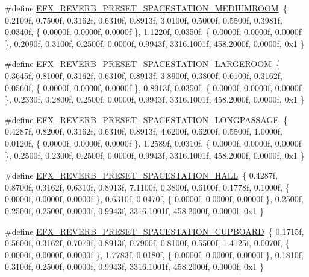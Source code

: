 \begin{DoxyCompactItemize}
\item 
\#define \mbox{\hyperlink{efx-presets_8h_a2ca95e780372e4102f6439c01bbb4c47}{E\+F\+X\+\_\+\+R\+E\+V\+E\+R\+B\+\_\+\+P\+R\+E\+S\+E\+T\+\_\+\+S\+P\+A\+C\+E\+S\+T\+A\+T\+I\+O\+N\+\_\+\+M\+E\+D\+I\+U\+M\+R\+O\+OM}}~\{ 0.\+2109f, 0.\+7500f, 0.\+3162f, 0.\+6310f, 0.\+8913f, 3.\+0100f, 0.\+5000f, 0.\+5500f, 0.\+3981f, 0.\+0340f, \{ 0.\+0000f, 0.\+0000f, 0.\+0000f \}, 1.\+1220f, 0.\+0350f, \{ 0.\+0000f, 0.\+0000f, 0.\+0000f \}, 0.\+2090f, 0.\+3100f, 0.\+2500f, 0.\+0000f, 0.\+9943f, 3316.\+1001f, 458.\+2000f, 0.\+0000f, 0x1 \}
\item 
\#define \mbox{\hyperlink{efx-presets_8h_a2fc89101c08d137174083f3db35a890d}{E\+F\+X\+\_\+\+R\+E\+V\+E\+R\+B\+\_\+\+P\+R\+E\+S\+E\+T\+\_\+\+S\+P\+A\+C\+E\+S\+T\+A\+T\+I\+O\+N\+\_\+\+L\+A\+R\+G\+E\+R\+O\+OM}}~\{ 0.\+3645f, 0.\+8100f, 0.\+3162f, 0.\+6310f, 0.\+8913f, 3.\+8900f, 0.\+3800f, 0.\+6100f, 0.\+3162f, 0.\+0560f, \{ 0.\+0000f, 0.\+0000f, 0.\+0000f \}, 0.\+8913f, 0.\+0350f, \{ 0.\+0000f, 0.\+0000f, 0.\+0000f \}, 0.\+2330f, 0.\+2800f, 0.\+2500f, 0.\+0000f, 0.\+9943f, 3316.\+1001f, 458.\+2000f, 0.\+0000f, 0x1 \}
\item 
\#define \mbox{\hyperlink{efx-presets_8h_a8959825c810876082f20684cc9e7203a}{E\+F\+X\+\_\+\+R\+E\+V\+E\+R\+B\+\_\+\+P\+R\+E\+S\+E\+T\+\_\+\+S\+P\+A\+C\+E\+S\+T\+A\+T\+I\+O\+N\+\_\+\+L\+O\+N\+G\+P\+A\+S\+S\+A\+GE}}~\{ 0.\+4287f, 0.\+8200f, 0.\+3162f, 0.\+6310f, 0.\+8913f, 4.\+6200f, 0.\+6200f, 0.\+5500f, 1.\+0000f, 0.\+0120f, \{ 0.\+0000f, 0.\+0000f, 0.\+0000f \}, 1.\+2589f, 0.\+0310f, \{ 0.\+0000f, 0.\+0000f, 0.\+0000f \}, 0.\+2500f, 0.\+2300f, 0.\+2500f, 0.\+0000f, 0.\+9943f, 3316.\+1001f, 458.\+2000f, 0.\+0000f, 0x1 \}
\item 
\#define \mbox{\hyperlink{efx-presets_8h_a06d326b0ff198538c867c2e2a05bee01}{E\+F\+X\+\_\+\+R\+E\+V\+E\+R\+B\+\_\+\+P\+R\+E\+S\+E\+T\+\_\+\+S\+P\+A\+C\+E\+S\+T\+A\+T\+I\+O\+N\+\_\+\+H\+A\+LL}}~\{ 0.\+4287f, 0.\+8700f, 0.\+3162f, 0.\+6310f, 0.\+8913f, 7.\+1100f, 0.\+3800f, 0.\+6100f, 0.\+1778f, 0.\+1000f, \{ 0.\+0000f, 0.\+0000f, 0.\+0000f \}, 0.\+6310f, 0.\+0470f, \{ 0.\+0000f, 0.\+0000f, 0.\+0000f \}, 0.\+2500f, 0.\+2500f, 0.\+2500f, 0.\+0000f, 0.\+9943f, 3316.\+1001f, 458.\+2000f, 0.\+0000f, 0x1 \}
\item 
\#define \mbox{\hyperlink{efx-presets_8h_ae01167f43aaf48bd4fc8ab19c1f1c5d9}{E\+F\+X\+\_\+\+R\+E\+V\+E\+R\+B\+\_\+\+P\+R\+E\+S\+E\+T\+\_\+\+S\+P\+A\+C\+E\+S\+T\+A\+T\+I\+O\+N\+\_\+\+C\+U\+P\+B\+O\+A\+RD}}~\{ 0.\+1715f, 0.\+5600f, 0.\+3162f, 0.\+7079f, 0.\+8913f, 0.\+7900f, 0.\+8100f, 0.\+5500f, 1.\+4125f, 0.\+0070f, \{ 0.\+0000f, 0.\+0000f, 0.\+0000f \}, 1.\+7783f, 0.\+0180f, \{ 0.\+0000f, 0.\+0000f, 0.\+0000f \}, 0.\+1810f, 0.\+3100f, 0.\+2500f, 0.\+0000f, 0.\+9943f, 3316.\+1001f, 458.\+2000f, 0.\+0000f, 0x1 \}

\end{DoxyCompactItemize}
